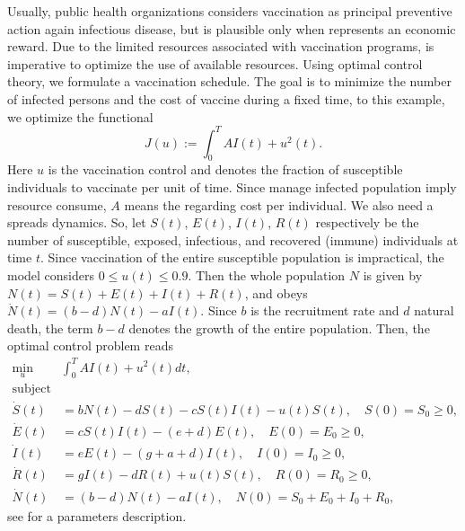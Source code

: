 Usually, public health organizations considers vaccination as principal
preventive action again infectious disease, but is plausible only when
represents an economic reward. 
Due to the limited resources associated with vaccination programs, is imperative
to optimize the use of available resources. Using optimal control theory, we
formulate a vaccination schedule. The goal is to minimize the number of infected
persons and the cost of vaccine during a fixed time, to this example, we 
optimize the functional
$$
  J(u):= 
  \int_{0}^{T}
    A I(t) + u^2(t) .
$$
Here $u$ is the vaccination control and denotes the fraction of
susceptible individuals to vaccinate per unit of time. Since manage infected 
population imply resource consume, $A$ means the regarding cost per individual.
We also need a spreads dynamics. So, let $S(t)$, $E(t)$, $I(t)$, $R(t)$
respectively be the number of susceptible, exposed, infectious, and recovered
(immune) individuals at time $t$. Since vaccination of
the entire susceptible population is impractical, the model considers 
$0 \leq u(t) \leq 0.9$. Then the whole population $N$ is given by 
$N(t) = S(t) + E(t) + I(t) + R (t)$, and obeys
$
  \dot{N}(t) =
    (b - d)N(t) - aI(t).
$
Since $b$ is the recruitment rate and $d$ natural death, the term $b-d$ denotes 
the growth of the entire population. Then, the optimal control problem reads
%
%
\begin{equation} \label{eqn:epidemics_lenhart}
  \begin{aligned}
    \min_{u} & \int_{0}^{T} AI(t) + u^{2}(t) dt,
    \\
    \text{subject to}
    \\
      \dot{S}(t) &=
          bN(t) - dS(t) - cS(t)I(t) - u(t)S(t), \quad S(0) = S_0 \geq 0,   \\
      \dot{E}(t) &=
          cS(t)I(t) - (e + d)E(t), \quad E(0) = E_0 \geq 0,    \\
      \dot{I}(t) &=
          eE(t) - (g + a +d)I(t), \quad I(0) = I_0 \geq 0,     \\
      \dot{R}(t) &=
          gI(t) -dR(t) + u(t)S(t), \quad R(0) = R_0 \geq 0,    \\
        \dot{N}(t) &=
          (b - d)N(t) - aI(t), \quad N(0)= S_0 + E_0 + I_0 + R_0, 
  \end{aligned}
\end{equation}
see  for a parameters description.

